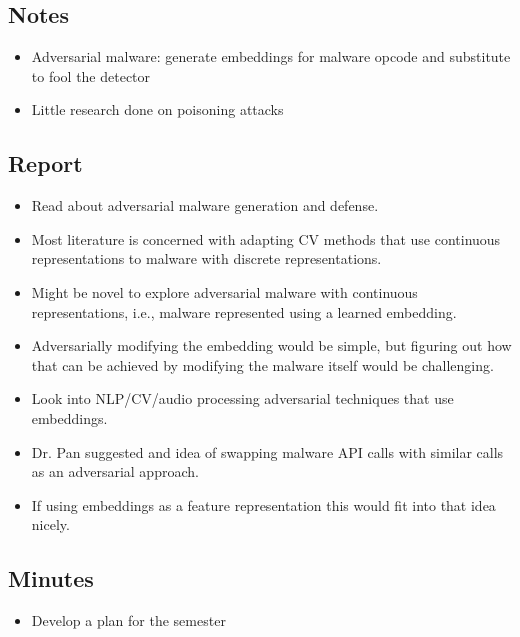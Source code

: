 \documentclass{article}
\begin{document}
\subsection*{Notes}

\begin{itemize}
	\item Adversarial malware: generate embeddings for malware opcode and substitute to fool the detector
	\item Little research done on poisoning attacks
\end{itemize}

\subsection*{Report}

\begin{itemize}
	\item Read about adversarial malware generation and defense.
	\item Most literature is concerned with adapting CV methods that use continuous representations to malware with discrete representations.
	\item Might be novel to explore adversarial malware with continuous representations, i.e., malware represented using a learned embedding.
	\item Adversarially modifying the embedding would be simple, but figuring out how that can be achieved by modifying the malware itself would be challenging.
	\item Look into NLP/CV/audio processing adversarial techniques that use embeddings.
	\item Dr. Pan suggested and idea of swapping malware API calls with similar calls as an adversarial approach.
	\item If using embeddings as a feature representation this would fit into that idea nicely.
\end{itemize}

\subsection*{Minutes}

\begin{itemize}
	\item Develop a plan for the semester
\end{itemize}

\pagebreak

\end{document}
